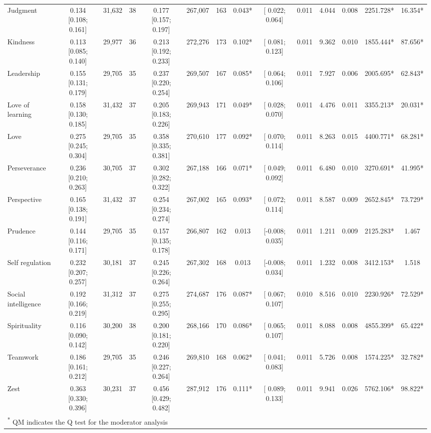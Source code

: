 \documentclass[
  man,floatsintext]{apa6}
\begin{document}
\begin{table}
{\begin{tabular}[t]{lccccccccccccc}
Judgment & 0.134 [0.108; 0.161] & 31,632 & 38 & 0.177 [0.157; 0.197] & 267,007 & 163 & 0.043* & {}[ 0.022; 0.064] & 0.011 & 4.044 & 0.008 & 2251.728* & 16.354*\\
Kindness & 0.113 [0.085; 0.140] & 29,977 & 36 & 0.213 [0.192; 0.233] & 272,276 & 173 & 0.102* & {}[ 0.081; 0.123] & 0.011 & 9.362 & 0.010 & 1855.444* & 87.656*\\
Leadership & 0.155 [0.131; 0.179] & 29,705 & 35 & 0.237 [0.220; 0.254] & 269,507 & 167 & 0.085* & {}[ 0.064; 0.106] & 0.011 & 7.927 & 0.006 & 2005.695* & 62.843*\\
Love of learning & 0.158 [0.130; 0.185] & 31,432 & 37 & 0.205 [0.183; 0.226] & 269,943 & 171 & 0.049* & {}[ 0.028; 0.070] & 0.011 & 4.476 & 0.011 & 3355.213* & 20.031*\\
\addlinespace
Love & 0.275 [0.245; 0.304] & 29,705 & 35 & 0.358 [0.335; 0.381] & 270,610 & 177 & 0.092* & {}[ 0.070; 0.114] & 0.011 & 8.263 & 0.015 & 4400.771* & 68.281*\\
Perseverance & 0.236 [0.210; 0.263] & 30,705 & 37 & 0.302 [0.282; 0.322] & 267,188 & 166 & 0.071* & {}[ 0.049; 0.092] & 0.011 & 6.480 & 0.010 & 3270.691* & 41.995*\\
Perspective & 0.165 [0.138; 0.191] & 31,432 & 37 & 0.254 [0.234; 0.274] & 267,002 & 165 & 0.093* & {}[ 0.072; 0.114] & 0.011 & 8.587 & 0.009 & 2652.845* & 73.729*\\
Prudence & 0.144 [0.116; 0.171] & 29,705 & 35 & 0.157 [0.135; 0.178] & 266,807 & 162 & 0.013 & {}[-0.008; 0.035] & 0.011 & 1.211 & 0.009 & 2125.283* & 1.467\\
Self regulation & 0.232 [0.207; 0.257] & 30,181 & 37 & 0.245 [0.226; 0.264] & 267,302 & 168 & 0.013 & {}[-0.008; 0.034] & 0.011 & 1.232 & 0.008 & 3412.153* & 1.518\\
\addlinespace
Social intelligence & 0.192 [0.166; 0.219] & 31,312 & 37 & 0.275 [0.255; 0.295] & 274,687 & 176 & 0.087* & {}[ 0.067; 0.107] & 0.010 & 8.516 & 0.010 & 2230.926* & 72.529*\\
Spirituality & 0.116 [0.090; 0.142] & 30,200 & 38 & 0.200 [0.181; 0.220] & 268,166 & 170 & 0.086* & {}[ 0.065; 0.107] & 0.011 & 8.088 & 0.008 & 4855.399* & 65.422*\\
Teamwork & 0.186 [0.161; 0.212] & 29,705 & 35 & 0.246 [0.227; 0.264] & 269,810 & 168 & 0.062* & {}[ 0.041; 0.083] & 0.011 & 5.726 & 0.008 & 1574.225* & 32.782*\\
Zest & 0.363 [0.330; 0.396] & 30,231 & 37 & 0.456 [0.429; 0.482] & 287,912 & 176 & 0.111* & {}[ 0.089; 0.133] & 0.011 & 9.941 & 0.026 & 5762.106* & 98.822*\\
\bottomrule
\multicolumn{14}{l}{\textsuperscript{*} QM indicates the Q test for the moderator analysis}\\
\end{tabular}}
\end{table}
\end{document}
